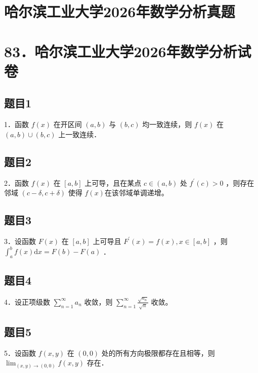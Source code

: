\documentclass{article}
\begin{document}
\section*{哈尔滨工业大学2026年数学分析真题}
\section*{83．哈尔滨工业大学2026年数学分析试卷}

\subsection{题目1}
1．函数 \(f(x)\) 在开区间 \((a, b)\) 与 \((b, c)\) 均一致连续，则 \(f(x)\) 在 \((a, b) \cup(b, c)\) 上一致连续．

\subsection{题目2}
2．函数 \(f(x)\) 在 \([a, b]\) 上可导，且在某点 \(c \in(a, b)\) 处 \(f^{\prime}(c)>0\) ，则存在邻域 \((c-\delta, c+\delta)\) 使得 \(f(x)\)在该邻域单调递增。

\subsection{题目3}
3．设函数 \(F(x)\) 在 \([a, b]\) 上可导且 \(F^{\prime}(x)=f(x), x \in[a, b]\) ，则 \(\int_{a}^{b} f(x) \mathrm{d} x=F(b)-F(a)\) ．

\subsection{题目4}
4．设正项级数 \(\sum_{n=1}^{\infty} a_{n}\) 收敛，则 \(\sum_{n=1}^{\infty} \frac{\sqrt{a_{n}}}{\sqrt{n}}\) 收敛。

\subsection{题目5}
5．设函数 \(f(x, y)\) 在 \((0,0)\) 处的所有方向极限都存在且相等，则 \(\lim _{(x, y) \rightarrow(0,0)} f(x, y)\) 存在．
\end{document}
